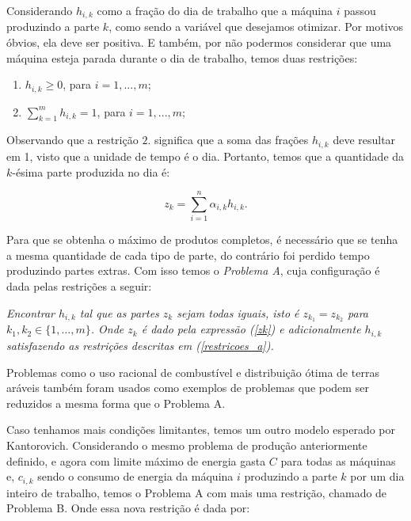 Considerando \(h_{i, k}\) como a fração do dia de trabalho que a máquina \(i\) passou produzindo
a parte \(k\), como sendo a variável que desejamos otimizar. Por motivos óbvios, ela deve ser positiva.
E também, por não podermos considerar que uma máquina esteja parada durante o dia de trabalho, temos
duas restrições:

\vspace{5pt}

\begin{enumerate}[leftmargin=5em]%
  \item \(h_{i, k} \geq 0\), para \(i =1, ..., m \);
  \item \(\sum_{k=1}^m h_{i, k} = 1\), para \(i =1, ..., m \);
  \label{restricoes_a}
\end{enumerate}

\vspace{5pt}

Observando que a restrição \(2.\) significa que a soma das frações \(h_{i, k}\) deve resultar
em 1, visto que a unidade de tempo é o dia. Portanto, temos que a quantidade da \(k\)-ésima parte
produzida no dia é:

\vspace{-15pt}

\begin{equation}
  z_k = \sum_{i=1}^n \alpha_{i, k} h_{i, k}.
  \label{zk}
\end{equation}


\par Para que se obtenha o máximo de produtos completos, é necessário que se tenha a mesma quantidade de
cada tipo de parte, do contrário foi perdido tempo produzindo partes extras. Com isso temos o
\textit{Problema A}, cuja configuração é dada pelas restrições a seguir:

\textit{
  Encontrar \(h_{i, k}\) tal que as partes \(z_k\) sejam todas iguais, isto é \(z_{k_1} = z_{k_2} \)
  para \(k_1, k_2 \in \{1, ..., m\}\). Onde \(z_k\) é dado pela expressão (\ref{zk}) e adicionalmente
  \(h_{i, k}\) satisfazendo as restrições descritas em (\ref{restricoes_a}).
}

Problemas como o uso racional de combustível e distribuição ótima de terras aráveis
também foram usados como exemplos de problemas que podem ser reduzidos a mesma forma
que o Problema A.

Caso tenhamos mais condições limitantes, temos um outro modelo esperado por Kantorovich.
Considerando o mesmo problema de produção anteriormente definido, e agora com limite
máximo de energia gasta \(C\) para todas as máquinas e, \(c_{i, k}\) sendo o consumo de energia
da máquina \(i\) produzindo a parte \(k\) por um dia inteiro de trabalho, temos o Problema A com
mais uma restrição, chamado de Problema B. Onde essa nova restrição é dada por:

